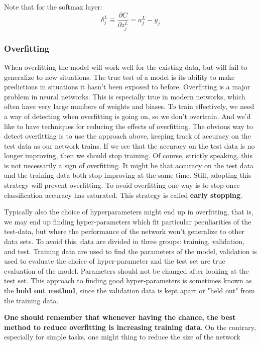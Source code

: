 \documentclass[12pt, letterpaper]{article}
\theoremstyle{definition}
\let\tb\textbf
\begin{document}
Note that for the softmax layer:
\begin{equation}
\delta_j^L \equiv\frac{\partial C}{\partial z_j^L} = a_j^L-y_j 
\end{equation}

\subsubsection{Overfitting}
When overfitting the model will work well for the existing data, but will fail to generalize to new situations. The true test of a model is its ability to make predictions in situations it hasn't been exposed to before. Overfitting is a major problem in neural networks. This is especially true in modern networks, which often have very large numbers of weights and biases. To train effectively, we need a way of detecting when overfitting is going on, so we don't overtrain. And we'd like to have techniques for reducing the effects of overfitting. The obvious way to detect overfitting is to use the approach above, keeping track of accuracy on the test data as our network trains. If we see that the accuracy on the test data is no longer improving, then we should stop training. Of course, strictly speaking, this is not necessarily a sign of overfitting. It might be that accuracy on the test data and the training data both stop improving at the same time. Still, adopting this strategy will prevent overfitting. To avoid overfitting one way is to stop once classification accuracy has saturated. This strategy is called \tb{early stopping}.

Typically also the choice of hyperparameters might end up in overfitting, that is, we may end up finding hyper-parameters which fit particular peculiarities of the test-data, but where the performance of the network won't generalize to other data sets. To avoid this, data are divided in three groups: training, validation, and test. Training data are used to find the parameters of the model, validation is used to evaluate the choice of hyper-parameter and the test set are true evaluation of the model. Parameters should not be changed after looking at the test set.  This approach to finding good hyper-parameters is sometimes known as the \tb{hold out method}, since the validation data is kept apart or "held out" from the training data.

\tb{One should remember that whenever having the chance, the best method to reduce overfitting is increasing training data}. On the contrary, especially for simple tasks, one might thing to reduce the size of the network
\end{document}
